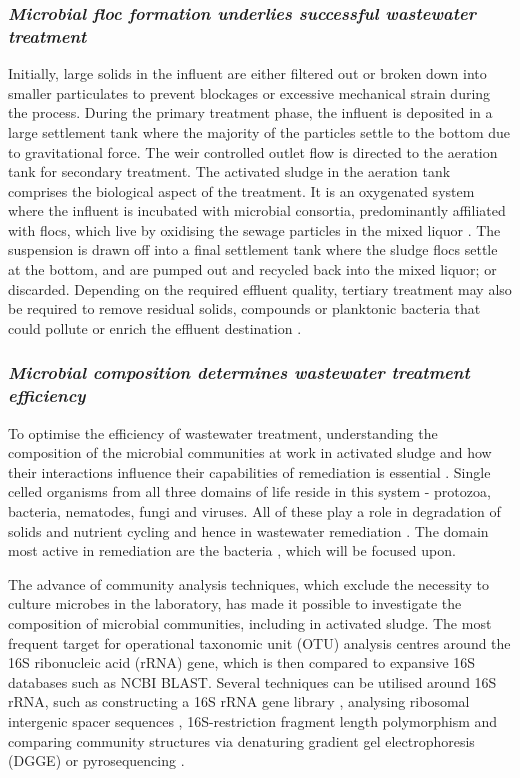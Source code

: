 \documentclass[11pt]{article}
\begin{document}
\subsubsection{\emph{Microbial floc formation underlies successful wastewater treatment}}
Initially, large solids in the influent are either filtered out or broken down into smaller particulates to prevent blockages or excessive mechanical strain during the process. During the primary treatment phase, the influent is deposited in a large settlement tank where the majority of the particles settle to the bottom due to gravitational force. The weir controlled outlet flow is directed to the aeration tank for secondary treatment. The activated sludge in the aeration tank comprises the biological aspect of the treatment. It is an oxygenated system where the influent is incubated with microbial consortia, predominantly affiliated with flocs, which live by oxidising the sewage particles in the mixed liquor \cite{mayhew1997low}. The suspension is drawn off into a final settlement tank where the sludge flocs settle at the bottom, and are pumped out and recycled back into the mixed liquor; or discarded. Depending on the required effluent quality, tertiary treatment may also be required to remove residual solids, compounds or planktonic bacteria that could pollute or enrich the effluent destination \cite{Price_95}.

\subsubsection{\emph{Microbial composition determines wastewater treatment efficiency}}
To optimise the efficiency of wastewater treatment, understanding the composition of the microbial communities at work in activated sludge and how their interactions influence their capabilities of remediation is essential \cite{daims2006}.
Single celled organisms from all three domains of life reside in this system - protozoa, bacteria, nematodes, fungi and viruses. All of these play a role in degradation of solids and nutrient cycling and hence in wastewater remediation \cite{muchie2010bioremediation}. The domain most active in remediation are the bacteria \cite{spellman2008handbook}, which will be focused upon.

The advance of community analysis techniques, which exclude the necessity to culture microbes in the laboratory, has made it possible to investigate the composition of microbial communities, including in activated sludge. The most frequent target for operational taxonomic unit (OTU) analysis centres around the 16S ribonucleic acid (rRNA) gene, which is then compared to expansive 16S databases such as NCBI BLAST. Several techniques can be utilised around 16S rRNA, such as constructing a 16S rRNA gene library \cite{McGarvey_04}, analysing ribosomal intergenic spacer sequences \cite{Yu_01}, 16S-restriction fragment length polymorphism \cite{Gilbride_06} and comparing community structures via denaturing gradient gel electrophoresis (DGGE) \cite{Hesham_11} or pyrosequencing \cite{wang2012pyrosequencing}.
\end{document}
